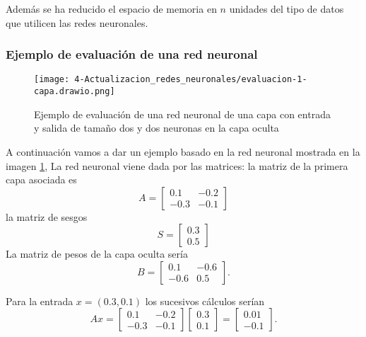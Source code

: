 Además se ha reducido el espacio de memoria en $n$ unidades del tipo de datos que utilicen las redes neuronales. 

\subsubsection*{Ejemplo de evaluación de una red neuronal}
\begin{figure}[h!]
    \texttt{[image: 4-Actualizacion\_redes\_neuronales/evaluacion-1-capa.drawio.png]}
    \centering
    \caption{Ejemplo de evaluación de una red neuronal de una capa con entrada y salida de tamaño dos y dos neuronas en la capa oculta}
    \label{img:Ejemplo-evaluación-red-neruonal-una-capa}
\end{figure}

A continuación vamos a dar un ejemplo basado en la red neuronal mostrada en la imagen \ref{img:Ejemplo-evaluación-red-neruonal-una-capa}, 
La red neuronal viene dada por las matrices: 
la matriz de la primera capa asociada es 
\begin{equation}
     A = 
        \begin{bmatrix}
            0.1 & -0.2 \\
            -0.3 & -0.1 
        \end{bmatrix}  
\end{equation}
la matriz de sesgos 
\begin{equation}
    S = 
        \begin{bmatrix}
            0.3  \\
            0.5 
        \end{bmatrix}  
\end{equation}
La matriz de pesos de la capa oculta sería 
\begin{equation}
     B = 
    \begin{bmatrix}
        0.1 & -0.6 \\
        -0.6 & 0.5
    \end{bmatrix}. 
\end{equation}

Para la entrada  $x = (0.3, 0.1)$ los sucesivos cálculos serían
\begin{equation}
    A x = 
    \begin{bmatrix}
        0.1 & -0.2 \\
        -0.3 & -0.1 
    \end{bmatrix}  
    \begin{bmatrix}
        0.3  \\
        0.1 
    \end{bmatrix}
    = 
    \begin{bmatrix}
        0.01  \\
        -0.1 
    \end{bmatrix}
    . 
\end{equation}

